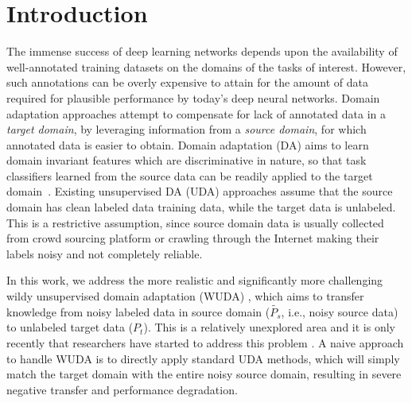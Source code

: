 \section{Introduction}
The immense success of deep learning networks depends upon the availability of well-annotated training datasets on the domains of the tasks of interest. 
However, such annotations can be overly expensive to attain for the amount of data required for plausible performance by today’s deep neural networks. 
Domain adaptation approaches attempt to compensate for lack of annotated data in a \textit{target domain}, by leveraging information from a \textit{source domain}, for which annotated data is easier to obtain. 
Domain adaptation (DA) aims to learn domain invariant features which are discriminative in nature, so that task classifiers learned from the source data can be readily applied to the target domain~\cite{uda,dann,ctc,ltdan,atda,saito2017maximum}.
Existing unsupervised DA (UDA) approaches assume that the source domain has clean labeled data training data, while the target data is unlabeled. 
This is a restrictive assumption, since source domain data is usually collected from crowd sourcing platform or crawling through the Internet making their labels noisy and not completely reliable.

In this work, we address the more realistic and significantly more challenging wildy unsupervised domain adaptation (WUDA) \cite{tcl,butterfly}, which aims to transfer knowledge from noisy labeled data in source domain ($\tilde{P_s}$, i.e., noisy source data) to unlabeled target data ($P_t$).
This is a relatively unexplored area and it is only recently that researchers have started to address this problem \cite{tcl,butterfly}.
A naive approach to handle WUDA is to directly apply standard UDA methods, which will simply match the target domain with the entire noisy
source domain, resulting in severe negative transfer and performance degradation. 

